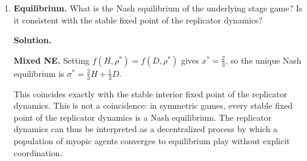 \documentclass[12pt]{article}
\newenvironment{solution}{%
  \ifshowsolutions\begin{solutionbox}\noindent\textbf{\color{blue!70!black}Solution.}\quad\fi
  \ifshowsolutions\else\expandafter\comment\fi
}{%
  \ifshowsolutions\end{solutionbox}\fi
  \ifshowsolutions\else\expandafter\endcomment\fi
}
\begin{document}
\begin{enumerate}
  \item \textbf{Equilibrium.} What is the Nash equilibrium of the underlying stage game? Is it consistent with the stable fixed point of the replicator dynamics?

  \begin{solution}
    \textbf{Mixed NE.} Setting $f(H,\rho^*) = f(D,\rho^*)$ gives $x^* = \tfrac{2}{3}$, so the unique Nash equilibrium is $\sigma^* = \tfrac{2}{3}H + \tfrac{1}{3}D$.

    This coincides exactly with the stable interior fixed point of the replicator dynamics. This is not a coincidence: in symmetric games, every stable fixed point of the replicator dynamics is a Nash equilibrium. The replicator dynamics can thus be interpreted as a decentralized process by which a population of myopic agents converges to equilibrium play without explicit coordination.
  \end{solution}
\end{enumerate}
\end{document}
